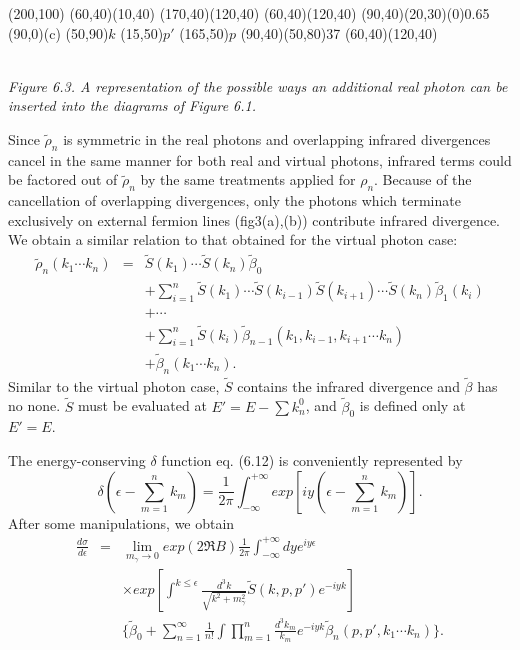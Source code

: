 \begin{center}
	\begin{axopicture}(200,100)
		\Line[arrow](60,40)(10,40)
		\Line[arrow](170,40)(120,40)
		\Line[arrow](60,40)(120,40)
		\GOval(90,40)(20,30)(0){0.65}
		\Text(90,0){(c)}
		\Text(50,90){$k$}
		\Text(15,50){$p'$} 	\Text(165,50){$p$}
		\Photon(90,40)(50,80){3}{7}
		\Line(60,40)(120,40)
	\end{axopicture}   
	\\{\sl Figure 6.3. A representation of the possible ways an additional real photon can be inserted into the diagrams of Figure 6.1.}                  
\end{center}

Since $\tilde{\rho}_n$ is symmetric in the real photons and overlapping infrared divergences cancel in the same manner for both real and virtual photons, infrared terms could be factored out of $\tilde{\rho}_n$ by the same treatments applied for $\rho_n$. Because of the cancellation of overlapping divergences, only the photons which terminate exclusively on external fermion lines (fig3(a),(b)) contribute infrared divergence. We obtain a similar relation to that obtained for the virtual photon case:
\begin{eqnarray}
\tilde{\rho}_n(k_1\cdots k_n) &=& \tilde{S}(k_1)\cdots \tilde{S}(k_n)\tilde{\beta}_0\nonumber\\
&& +\sum_{i=1}^{n}\tilde{S}(k_1)\cdots \tilde{S}(k_{i-1})\tilde{S}(k_{i+1})\cdots \tilde{S}(k_{n})\tilde{\beta}_1(k_i)\nonumber\\
&& + \cdots \nonumber\\
&& + \sum_{i=1}^{n}\tilde{S}(k_i)\tilde{\beta}_{n-1}(k_1,k_{i-1},k_{i+1}\cdots k_n)\nonumber\\
&& + \tilde{\beta}_n (k_1\cdots k_n).
\end{eqnarray}
Similar to the virtual photon case, $\tilde{S}$ contains the infrared divergence and $\tilde{\beta}$ has no none. $\tilde{S}$ must be evaluated at $E' = E - \sum k_n^0$, and $\tilde{\beta}_0$ is defined only at $E' = E$.

The energy-conserving $\delta$ function eq. (6.12) is conveniently represented by  \cite{JMJ,YS}
\begin{equation}
\delta\left(\epsilon - \sum_{m=1}^{n}k_m\right) = \frac{1}{2\pi}\int_{-\infty}^{+\infty}exp \left[iy\left(\epsilon-\sum_{m=1}^{n} k_m\right)\right].
\end{equation}
After some manipulations, we obtain
\begin{eqnarray}
\frac{d\sigma}{d\epsilon} &=& \lim_{m_\gamma\to 0} exp(2\Re B)\frac{1}{2\pi}\int_{-\infty}^{+\infty}dy e^{iy\epsilon}\nonumber\\
&&\times exp\left[\int^{k\leq\epsilon}\frac{d^3k}{\sqrt{k^2 + m_\gamma^2}}\tilde{S}(k,p,p')e^{-iyk}\right]\nonumber\\
&&\Bigg\{ \tilde{\beta}_0 + \sum_{n = 1}^{\infty}\frac{1}{n!}\int \prod_{m=1}^n \frac{d^3 k_m}{k_m} e^{-iyk}\tilde{\beta}_n(p,p',k_1\cdots k_n) \Bigg\}.
\end{eqnarray} 

